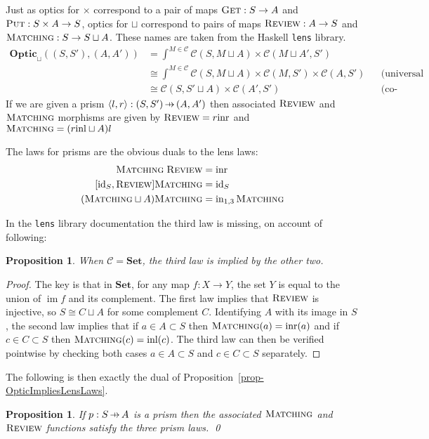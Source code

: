 \documentclass[11pt,a4paper]{article}
\theoremstyle{plain}
\newtheorem{proposition}[theorem]{Proposition}
\theoremstyle{definition}
\newcommand{\C}{\mathscr{C}}
\newcommand{\Set}{\mathbf{Set}}
\newcommand{\Optic}{\mathbf{Optic}}
\newcommand{\id}{\mathrm{id}}
\newcommand{\inl}{\mathrm{inl}}
\newcommand{\inr}{\mathrm{inr}}
\DeclareMathOperator{\im}{im}
\newcommand{\fget}{\textsc{Get}}
\newcommand{\fput}{\textsc{Put}}
\newcommand{\freview}{\textsc{Review}}
\newcommand{\fmatching}{\textsc{Matching}}
\newcommand{\hto}{\ensuremath{\,\mathaccent\shortmid\rightarrow\,}}
\begin{document}
Just as optics for $\times$ correspond to a pair of maps $\fget : S \to A$ and $\fput : S \times A \to S$, optics for $\sqcup$ correspond to pairs of maps $\freview : A \to S$ and $\fmatching : S \to S \sqcup A$. These names are taken from the Haskell \texttt{lens} library.
\begin{align*}
  \Optic_\sqcup((S, S'), (A, A')) &= \int^{M \in \C} \C(S, M \sqcup A) \times \C(M \sqcup A', S') \\
                                  &\cong \int^{M \in \C} \C(S, M \sqcup A) \times \C(M, S') \times \C(A, S') && \text{(universal property of coproduct)} \\
                                  &\cong \C(S, S' \sqcup A) \times \C(A', S') && \text{(co-Yoneda)}
\end{align*}
If we are given a prism $\langle l, r \rangle : (S, S') \hto (A, A')$ then associated $\freview$ and $\fmatching$ morphisms are given by $\freview = r \inr$ and $\fmatching = (r\inl \sqcup A)l$

The laws for prisms are the obvious duals to the lens laws:
\begin{align*}
  \fmatching \; \freview &= \inr \\
  [\id_S, \freview] \fmatching &= \id_S \\
  (\fmatching \sqcup A) \fmatching &= \mathrm{in}_{1,3} \, \fmatching
\end{align*}

In the \texttt{lens} library documentation the third law is missing, on account of following:

\begin{proposition}
  When $\C = \Set$, the third law is implied by the other two.
\end{proposition}
\begin{proof}
  The key is that in $\Set$, for any map $f : X \to Y$, the set $Y$ is equal to the union of $\im f$ and its complement. The first law implies that $\freview$ is injective, so $S \cong C \sqcup A$ for some complement $C$. Identifying $A$ with its image in $S$, the second law implies that if $a\in A \subset S$ then $\fmatching(a) = \inr(a)$ and if $c\in C \subset S$ then $\fmatching(c) = \inl(c)$. The third law can then be verified pointwise by checking both cases $a\in A \subset S$ and $c\in C \subset S$ separately.
\end{proof}

The following is then exactly the dual of Proposition~\ref{prop-OpticImpliesLensLaws}.
\begin{proposition}\label{prop-OpticImpliesPrismLaws}
  If $p : S \hto A$ is a prism then the associated $\fmatching$ and $\freview$ functions satisfy the three prism laws. \qed
\end{proposition}
\end{document}
